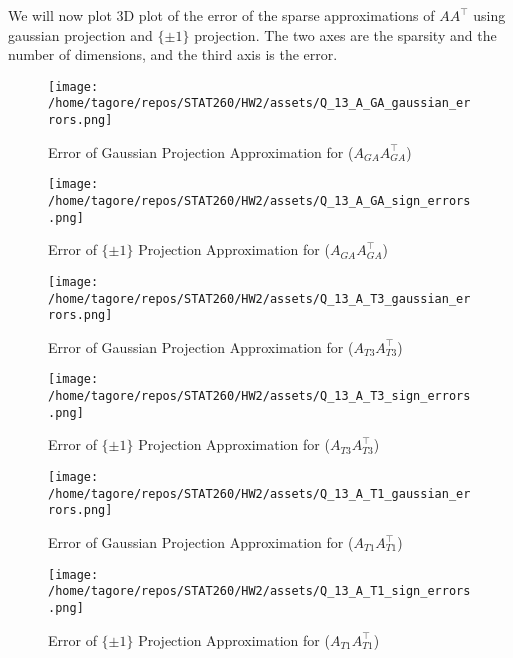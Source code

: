\documentclass{article}
\begin{document}
We will now plot 3D plot of the error of the sparse approximations of \(A A^\top\) using gaussian projection and $\{\pm 1\}$ projection. The two axes are the sparsity and the number of dimensions, and the third axis is the error.

\begin{figure}[H]
    \centering
    \texttt{[image: /home/tagore/repos/STAT260/HW2/assets/Q\_13\_A\_GA\_gaussian\_errors.png]}
    \caption{Error of Gaussian Projection Approximation for (\(A_{GA} A_{GA}^\top\))}
    \label{fig:GA_gaussian_projection_error_3d}
\end{figure}

\begin{figure}[H]
    \centering
    \texttt{[image: /home/tagore/repos/STAT260/HW2/assets/Q\_13\_A\_GA\_sign\_errors.png]}
    \caption{Error of $\{\pm 1\}$ Projection Approximation for (\(A_{GA} A_{GA}^\top\))}
    \label{fig:GA_pm1_projection_error_3d}
\end{figure}

\begin{figure}[H]
    \centering
    \texttt{[image: /home/tagore/repos/STAT260/HW2/assets/Q\_13\_A\_T3\_gaussian\_errors.png]}
    \caption{Error of Gaussian Projection Approximation for (\(A_{T3} A_{T3}^\top\))}
    \label{fig:T3_gaussian_projection_error_3d}
\end{figure}

\begin{figure}[H]
    \centering
    \texttt{[image: /home/tagore/repos/STAT260/HW2/assets/Q\_13\_A\_T3\_sign\_errors.png]}
    \caption{Error of $\{\pm 1\}$ Projection Approximation for (\(A_{T3} A_{T3}^\top\))}
    \label{fig:T3_pm1_projection_error_3d}
\end{figure}

\begin{figure}[H]
    \centering
    \texttt{[image: /home/tagore/repos/STAT260/HW2/assets/Q\_13\_A\_T1\_gaussian\_errors.png]}
    \caption{Error of Gaussian Projection Approximation for (\(A_{T1} A_{T1}^\top\))}
    \label{fig:T1_gaussian_projection_error_3d}
\end{figure}
 
\begin{figure}[H]
    \centering
    \texttt{[image: /home/tagore/repos/STAT260/HW2/assets/Q\_13\_A\_T1\_sign\_errors.png]}
    \caption{Error of $\{\pm 1\}$ Projection Approximation for (\(A_{T1} A_{T1}^\top\))}
    \label{fig:T1_pm1_projection_error_3d}
\end{figure}
\end{document}
